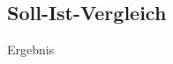 \subsection{Soll-Ist-Vergleich}
\begin{frame}{Ergebnis}
 \begin{overlayarea}{\textwidth}{.67\textheight}
   \vspace{3ex}
	\begin{figure}[b]


\end{figure}
\end{overlayarea}
\end{frame}
